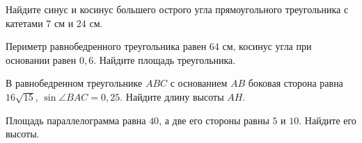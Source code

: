 \begin{class}[number=4]
\begin{listofex}[resume]
		\item Найдите синус и косинус  большего острого угла прямоугольного треугольника с катетами \( 7 \) см и \( 24  \) см.
		\item Периметр равнобедренного треугольника равен \( 64 \) см, косинус угла при основании равен \( 0,6 \). Найдите площадь треугольника.
		\item В равнобедренном треугольнике \( ABC \) с основанием \( AB \) боковая сторона равна \( 16\sqrt{15} \),  \( \sin\angle BAC=0,25 \). Найдите длину высоты \( AH \).
		\item Площадь параллелограмма равна \( 40 \), а две его стороны равны \( 5  \) и \( 10 \). Найдите его высоты.
	\end{listofex}
\end{class}

